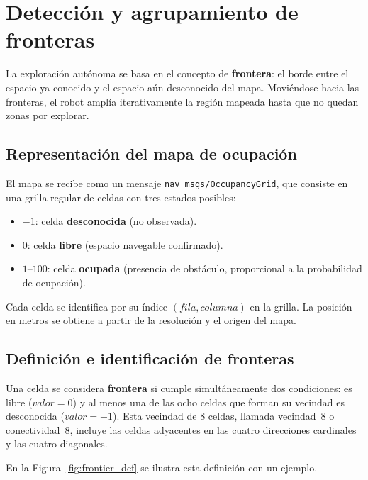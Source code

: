 \section{Detección y agrupamiento de fronteras}%
\label{sec:sol_frontiers}

La exploración autónoma se basa en el concepto de \textbf{frontera}: el borde
entre el espacio ya conocido y el espacio aún desconocido del mapa. Moviéndose
hacia las fronteras, el robot amplía iterativamente la región mapeada hasta que
no quedan zonas por explorar.

\subsection{Representación del mapa de ocupación}

El mapa se recibe como un mensaje \texttt{nav\_msgs/OccupancyGrid}, que consiste
en una grilla regular de celdas con tres estados posibles:

\begin{itemize}
    \item $-1$: celda \textbf{desconocida} (no observada).
    \item $0$: celda \textbf{libre} (espacio navegable confirmado).
    \item $1$--$100$: celda \textbf{ocupada} (presencia de obstáculo,
          proporcional a la probabilidad de ocupación).
\end{itemize}

Cada celda se identifica por su índice $(fila, columna)$ en la grilla. La
posición en metros se obtiene a partir de la resolución y el origen del mapa.

\subsection{Definición e identificación de fronteras}

Una celda se considera \textbf{frontera} si cumple simultáneamente dos
condiciones: es libre ($valor = 0$) y al menos una de las ocho celdas que
forman su vecindad es desconocida ($valor = -1$). Esta vecindad de 8 celdas,
llamada vecindad~8 o conectividad~8, incluye las celdas adyacentes en las
cuatro direcciones cardinales y las cuatro diagonales.

En la Figura~\ref{fig:frontier_def} se ilustra esta definición con un ejemplo.

